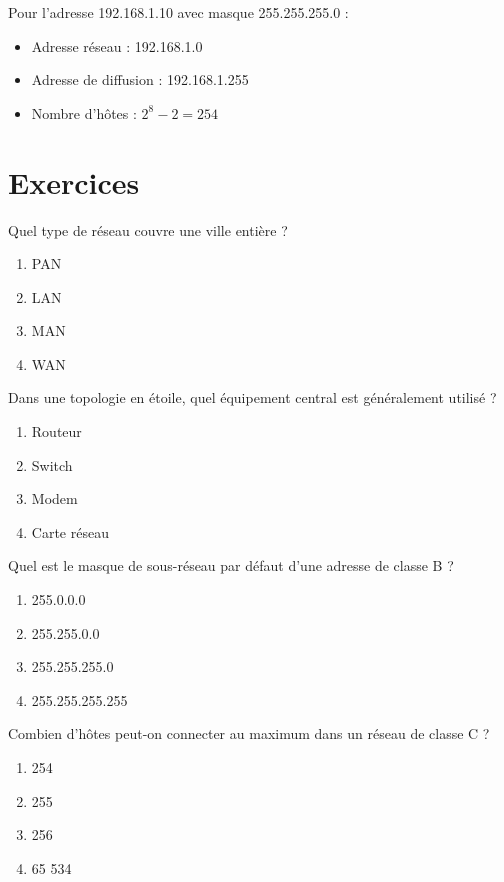 \begin{exemple}
Pour l'adresse 192.168.1.10 avec masque 255.255.255.0 :
\begin{itemize}
    \item Adresse réseau : 192.168.1.0
    \item Adresse de diffusion : 192.168.1.255
    \item Nombre d'hôtes : $2^8 - 2 = 254$
\end{itemize}
\end{exemple}

\section{Exercices}


\exo{}
Quel type de réseau couvre une ville entière ?
\begin{enumerate}
    \item PAN
    \item LAN
    \item MAN
    \item WAN
\end{enumerate}

\exo{}
Dans une topologie en étoile, quel équipement central est généralement utilisé ?
\begin{enumerate}
    \item Routeur
    \item Switch
    \item Modem
    \item Carte réseau
\end{enumerate}

\exo{}
Quel est le masque de sous-réseau par défaut d'une adresse de classe B ?
\begin{enumerate}
    \item 255.0.0.0
    \item 255.255.0.0
    \item 255.255.255.0
    \item 255.255.255.255
\end{enumerate}

\exo{}
Combien d'hôtes peut-on connecter au maximum dans un réseau de classe C ?
\begin{enumerate}
    \item 254
    \item 255
    \item 256
    \item 65 534
\end{enumerate}


